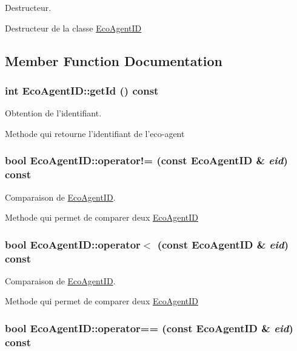 Destructeur. 

Destructeur de la classe \hyperlink{classEcoAgentID}{EcoAgentID} 

\subsection{Member Function Documentation}
\hypertarget{classEcoAgentID_30abc8a92bd07523b8e4f4baf312b56e}{
\subsubsection[{getId}]{\setlength{\rightskip}{0pt plus 5cm}int EcoAgentID::getId () const}}
\label{classEcoAgentID_30abc8a92bd07523b8e4f4baf312b56e}


Obtention de l'identifiant. 

Methode qui retourne l'identifiant de l'eco-agent \hypertarget{classEcoAgentID_8ffde7f02500120884ef35ade65b3e6e}{
\subsubsection[{operator!=}]{\setlength{\rightskip}{0pt plus 5cm}bool EcoAgentID::operator!= (const {\bf EcoAgentID} \& {\em eid}) const}}
\label{classEcoAgentID_8ffde7f02500120884ef35ade65b3e6e}


Comparaison de \hyperlink{classEcoAgentID}{EcoAgentID}. 

Methode qui permet de comparer deux \hyperlink{classEcoAgentID}{EcoAgentID} \hypertarget{classEcoAgentID_24d44b31302cd2761ffce1df8f74f12c}{
\subsubsection[{operator$<$}]{\setlength{\rightskip}{0pt plus 5cm}bool EcoAgentID::operator$<$ (const {\bf EcoAgentID} \& {\em eid}) const}}
\label{classEcoAgentID_24d44b31302cd2761ffce1df8f74f12c}


Comparaison de \hyperlink{classEcoAgentID}{EcoAgentID}. 

Methode qui permet de comparer deux \hyperlink{classEcoAgentID}{EcoAgentID} \hypertarget{classEcoAgentID_a6c183361e0ccdab9da2c6666d77c111}{
\subsubsection[{operator==}]{\setlength{\rightskip}{0pt plus 5cm}bool EcoAgentID::operator== (const {\bf EcoAgentID} \& {\em eid}) const}}
\label{classEcoAgentID_a6c183361e0ccdab9da2c6666d77c111}


